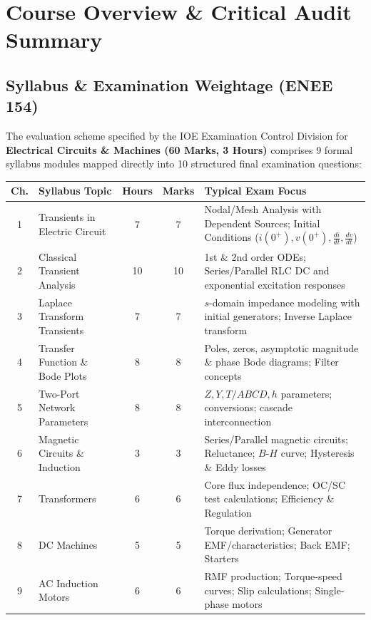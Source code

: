 \documentclass[11pt,a4paper,oneside]{article}
\begin{document}
\tableofcontents
\newpage

\section*{Course Overview \& Critical Audit Summary}

\subsection*{Syllabus \& Examination Weightage (ENEE 154)}
The evaluation scheme specified by the IOE Examination Control Division for \textbf{Electrical Circuits \& Machines (60 Marks, 3 Hours)} comprises 9 formal syllabus modules mapped directly into 10 structured final examination questions:

\begin{center}
\small
\begin{tabular}{@{}clccp{6.5cm}@{}}
\toprule
\textbf{Ch.} & \textbf{Syllabus Topic} & \textbf{Hours} & \textbf{Marks} & \textbf{Typical Exam Focus} \\
\midrule
1 & Transients in Electric Circuit & 7 & 7 & Nodal/Mesh Analysis with Dependent Sources; Initial Conditions ($i(0^+), v(0^+), \frac{di}{dt}, \frac{dv}{dt}$) \\
2 & Classical Transient Analysis & 10 & 10 & 1st \& 2nd order ODEs; Series/Parallel RLC DC and exponential excitation responses \\
3 & Laplace Transform Transients & 7 & 7 & $s$-domain impedance modeling with initial generators; Inverse Laplace transform \\
4 & Transfer Function \& Bode Plots & 8 & 8 & Poles, zeros, asymptotic magnitude \& phase Bode diagrams; Filter concepts \\
5 & Two-Port Network Parameters & 8 & 8 & $Z, Y, T/ABCD, h$ parameters; conversions; cascade interconnection \\
6 & Magnetic Circuits \& Induction & 3 & 3 & Series/Parallel magnetic circuits; Reluctance; $B$-$H$ curve; Hysteresis \& Eddy losses \\
7 & Transformers & 6 & 6 & Core flux independence; OC/SC test calculations; Efficiency \& Regulation \\
8 & DC Machines & 5 & 5 & Torque derivation; Generator EMF/characteristics; Back EMF; Starters \\
9 & AC Induction Motors & 6 & 6 & RMF production; Torque-speed curves; Slip calculations; Single-phase motors \\
\bottomrule
\end{tabular}
\end{center}
\end{document}
